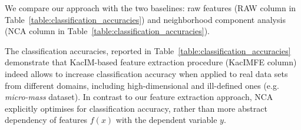 \documentclass{article}
\begin{document}
We compare our approach with the two baselines: raw features (RAW column in Table~\ref{table:classification_accuracies}) and neighborhood component analysis~\cite{NIPS2004_42fe8808} (NCA column in Table~\ref{table:classification_accuracies}).  %




The classification accuracies, reported in Table~\ref{table:classification_accuracies} demonstrate that KacIM-based feature extraction procedure (KacIMFE column) indeed allows to increase classification accuracy when applied to real data sets from different domains, including high-dimensional and ill-defined ones (e.g. \textit{micro-mass} dataset). In contrast to our feature extraction approach, NCA explicitly optimises for classification accuracy, rather than more abstract dependency of features $f(x)$ with the dependent variable $y$.
\end{document}
